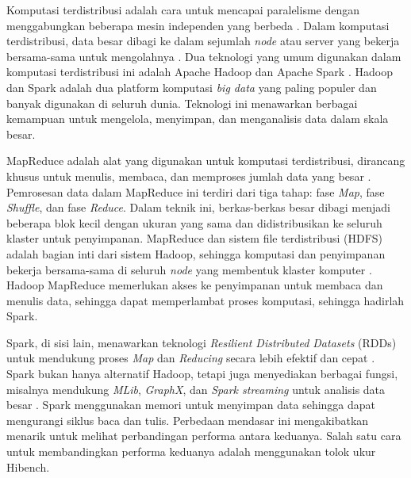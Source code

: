 
Komputasi terdistribusi adalah cara untuk mencapai paralelisme dengan menggabungkan beberapa mesin independen yang berbeda \cite{bhattacharyaEvaluatingDistributedComputing2021}. Dalam komputasi terdistribusi, data besar dibagi ke dalam sejumlah \textit{node} atau server yang bekerja bersama-sama untuk mengolahnya \cite{ahmedComprehensivePerformanceAnalysis2020}. Dua teknologi yang umum digunakan dalam komputasi terdistribusi ini adalah Apache Hadoop dan Apache Spark \cite{saputroPerbandinganKinerjaKomputasi2020}. Hadoop dan Spark adalah dua platform komputasi \textit{big data} yang paling populer dan banyak digunakan di seluruh dunia. Teknologi ini menawarkan berbagai kemampuan untuk mengelola, menyimpan, dan menganalisis data dalam skala besar. 

MapReduce adalah alat yang digunakan untuk komputasi terdistribusi, dirancang khusus untuk menulis, membaca, dan memproses jumlah data yang besar \cite{deanMapReduceSimplifiedData2004}. Pemrosesan data dalam MapReduce ini terdiri dari tiga tahap: fase \textit{Map}, fase \textit{Shuffle}, dan fase \textit{Reduce}. Dalam teknik ini, berkas-berkas besar dibagi menjadi beberapa blok kecil dengan ukuran yang sama dan didistribusikan ke seluruh klaster untuk penyimpanan. MapReduce dan sistem file terdistribusi (HDFS) adalah bagian inti dari sistem Hadoop, sehingga komputasi dan penyimpanan bekerja bersama-sama di seluruh \textit{node} yang membentuk klaster komputer \cite{samadiComparativeStudyHadoop2016}. Hadoop MapReduce memerlukan akses ke penyimpanan untuk membaca dan menulis data, sehingga dapat memperlambat proses komputasi, sehingga hadirlah Spark.

Spark, di sisi lain, menawarkan teknologi \textit{Resilient Distributed Datasets} (RDDs) untuk mendukung proses \textit{Map} dan \textit{Reducing} secara lebih efektif dan cepat \cite{ahmadvandGapproxUsingGallup2019}. Spark bukan hanya alternatif Hadoop, tetapi juga menyediakan berbagai fungsi, misalnya mendukung \textit{MLib}, \textit{GraphX}, dan \textit{Spark streaming} untuk analisis data besar \cite{zahariaSparkClusterComputing2010}. Spark menggunakan memori untuk menyimpan data sehingga dapat mengurangi siklus baca dan tulis. Perbedaan mendasar ini mengakibatkan menarik untuk melihat perbandingan performa antara keduanya. Salah satu cara untuk membandingkan performa keduanya adalah menggunakan tolok ukur Hibench.

